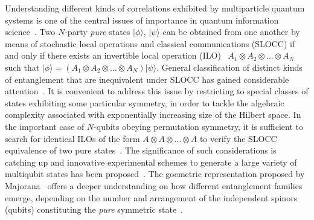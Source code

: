 \documentclass[pra,preprint,a4paper,superscriptaddress]{revtex4}
\begin{document}
Understanding different kinds of correlations exhibited by multiparticle quantum systems is one of the 
central issues of importance in quantum information science~\cite{Niel}. Two $N$-party {\em pure}  
states $\vert\phi\rangle$, $\vert \psi\rangle$  can be obtained from one another by means of stochastic local 
operations and classical communications (SLOCC)  if and only if there exists an invertible local operation 
(ILO)~\cite{Dur} $A_1\otimes A_2\otimes \ldots \otimes A_N$ such that $\vert \phi\rangle=\left(A_1\otimes A_2\otimes 
\ldots \otimes A_N\right)\vert\psi\rangle.$ General classification of distinct kinds of entanglement that are 
inequivalent under SLOCC has gained considerable attention~\cite{Dur,Ver,Lamata}.  
It is convenient to address this issue by restricting to special classes of states exhibiting some 
particular symmetry, in order to tackle the algebraic complexity associated with exponentially increasing size 
of the Hilbert space. In the important case of  $N$-qubits obeying permutation symmetry,  it is sufficient 
to search for identical ILOs of the form $A\otimes A\otimes\ldots \otimes A$ to verify the SLOCC equivalence of 
two pure states~\cite{solano,bastin}.  The significance of such considerations is catching up and  innovative 
experimental schemes to generate a large variety of multiqubit states has been proposed~\cite{newexpt1,newexpt2}. The goemetric representation proposed by Majorana~\cite{majorana} offers a 
deeper understanding on how different entanglement families emerge, depending on the number and arrangement of 
the independent spinors (qubits) constituting the {\em pure} symmetric state~\cite{solano}. 
\end{document}
